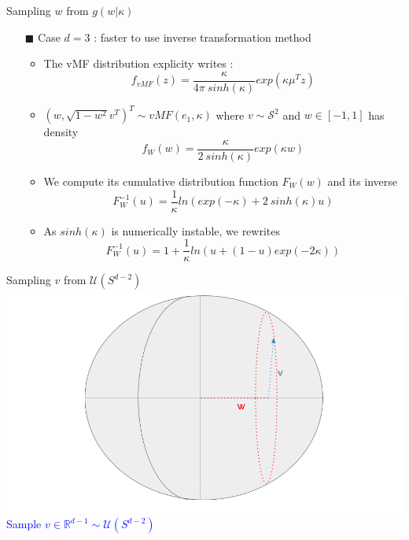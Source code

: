 \begin{frame}{Sampling $w$ from $g(w|\kappa)$}
  \begin{itemize}
    \item[$\blacksquare$] Case $d=3$ : faster to use inverse transformation method
    \begin{itemize}
      \item The vMF distribution explicity writes : $$ f_{vMF}(z) = \frac{\kappa}{4\pi\ sinh(\kappa)} exp(\kappa\mu^T z)  $$
      \item $(w, \sqrt{1 - w^2}v^T)^T \sim vMF(e_1, \kappa)$ where $v \sim \mathcal{S}^2$ and $w\in [-1, 1]$ has density $$ f_{W}(w) = \frac{\kappa}{2\ sinh(\kappa)} exp(\kappa w) $$
      \item We compute its cumulative distribution function $F_W(w)$ and its inverse  $$ F^{-1}_W (u) = \frac{1}{\kappa} ln(exp(-\kappa) + 2\ sinh(\kappa)u ) $$
      \item As $ sinh(\kappa) $ is numerically instable, we rewrites $$ F_W^{-1}(u) = 1 + \frac{1}{\kappa} ln(u + (1-u)exp(-2\kappa)) $$
    \end{itemize}
  \end{itemize}
\end{frame}

\begin{frame}{Sampling $v$ from $\mathcal{U}(S^{d-2})$}
  \centering
  \includegraphics[width=\textwidth]{figures/illustration_sampling_3.png}
  \textcolor{blue}{Sample $v \in \mathbb{R}^{d-1} \sim \mathcal{U}(S^{d-2})$}
\end{frame}


